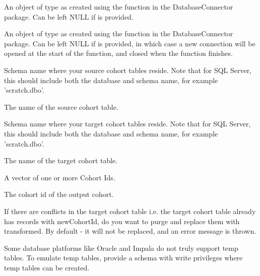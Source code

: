 \documentclass[a4paper]{book}
\begin{document}
\begin{Arguments}
\begin{ldescription}
\item[\code{connectionDetails}] An object of type  as created using the
 function in the
DatabaseConnector package. Can be left NULL if  is
provided.

\item[\code{connection}] An object of type  as created using the
 function in the
DatabaseConnector package. Can be left NULL if 
is provided, in which case a new connection will be opened at the start
of the function, and closed when the function finishes.

\item[\code{sourceCohortDatabaseSchema}] Schema name where your source cohort tables reside. Note that for SQL Server,
this should include both the database and schema name, for example
'scratch.dbo'.

\item[\code{sourceCohortTable}] The name of the source cohort table.

\item[\code{targetCohortDatabaseSchema}] Schema name where your target cohort tables reside. Note that for SQL Server,
this should include both the database and schema name, for example
'scratch.dbo'.

\item[\code{targetCohortTable}] The name of the target cohort table.

\item[\code{cohortIds}] A vector of one or more Cohort Ids.

\item[\code{newCohortId}] The cohort id of the output cohort.

\item[\code{purgeConflicts}] If there are conflicts in the target cohort table i.e. the target cohort table
already has records with newCohortId, do you want to purge and replace them
with transformed. By default - it will not be replaced, and an error message is thrown.

\item[\code{tempEmulationSchema}] Some database platforms like Oracle and Impala do not truly support
temp tables. To emulate temp tables, provide a schema with write
privileges where temp tables can be created.
\end{ldescription}
\end{Arguments}
\end{document}
